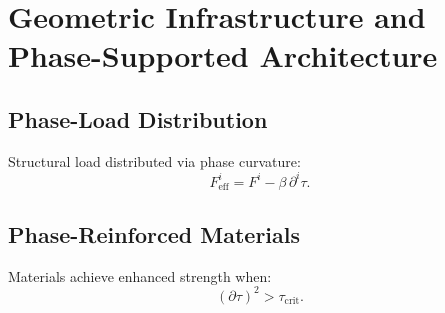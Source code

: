 \chapter{Geometric Infrastructure and Phase-Supported Architecture}

\section{Phase-Load Distribution}
Structural load distributed via phase curvature:
\[
F^i_{\mathrm{eff}} = F^i - \beta\,\partial^i\tau.
\]

\section{Phase-Reinforced Materials}
Materials achieve enhanced strength when:
\[
(\partial\tau)^2 > \tau_{\mathrm{crit}}.
\]

